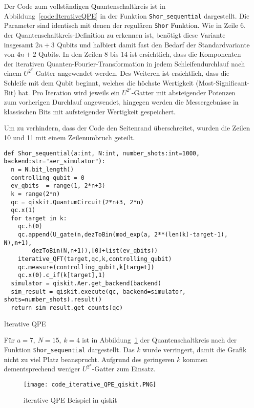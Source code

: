 Der Code zum vollständigen Quantenschaltkreis ist in Abbildung~\ref{code:IterativeQPE} in der Funktion \texttt{Shor_sequential} dargestellt.
Die Parameter sind identisch mit denen der regulären \texttt{Shor} Funktion. 
Wie in Zeile 6. der Quantenschaltkreis-Definition zu erkennen ist, 
benötigt diese Variante insgesamt \(2n+3\) Qubits und halbiert damit fast den Bedarf der Standardvariante von \(4n+2\) Qubits.
In den Zeilen 8 bis 14 ist ersichtlich, 
dass die Komponenten der iterativen Quanten-Fourier-Transformation in jedem Schleifendurchlauf nach einem \(U^{2^x}\)-Gatter angewendet werden. 
Des Weiteren ist ersichtlich, 
dass die Schleife mit dem Qubit beginnt, 
welches die höchste Wertigkeit (Most-Significant-Bit) hat.
Pro Iteration wird jeweils ein \(U^{2^x}\)-Gatter mit absteigender Potenzen zum vorherigen Durchlauf angewendet, 
hingegen werden die Messergebnisse in klassischen Bits mit aufsteigender Wertigkeit gespeichert.

Um zu verhindern, 
dass der Code den Seitenrand überschreitet, wurden die Zeilen 10 und 11 mit einem Zeilenumbruch geteilt.

\begin{listing}[H]
\begin{verbatim}    
def Shor_sequential(a:int, N:int, number_shots:int=1000, backend:str="aer_simulator"):
  n = N.bit_length()
  controlling_qubit = 0
  ev_qbits  = range(1, 2*n+3)
  k = range(2*n)
  qc = qiskit.QuantumCircuit(2*n+3, 2*n) 
  qc.x(1)
  for target in k:
    qc.h(0)
    qc.append(U_gate(n,dezToBin(mod_exp(a, 2**(len(k)-target-1), N),n+1),
        dezToBin(N,n+1)),[0]+list(ev_qbits))
    iterative_QFT(target,qc,k,controlling_qubit)
    qc.measure(controlling_qubit,k[target])
    qc.x(0).c_if(k[target],1)
  simulator = qiskit.Aer.get_backend(backend)
  sim_result = qiskit.execute(qc, backend=simulator, shots=number_shots).result()
  return sim_result.get_counts(qc)
  \end{verbatim}
  \caption{Iterative QPE}
  \label{code:IterativeQPE}
\end{listing}

Für \(a = 7,~N=15,~k=4\) ist in Abbildung~\ref{fig:iterative_iQPE_qiskit} der Quantenschaltkreis nach der Funktion \texttt{Shor_sequential} dargestellt.
Das \(k\) wurde verringert, damit die Grafik nicht zu viel Platz beansprucht.
Aufgrund des geringeren \(k\) kommen dementsprechend weniger \(U^{2^x}\)-Gatter zum Einsatz.

\begin{figure} [H]
  \centering
  \texttt{[image: code\_iterative\_QPE\_qiskit.PNG]}
  \caption{iterative QPE Beispiel in qiskit}
  \label{fig:iterative_iQPE_qiskit}
\end{figure}

